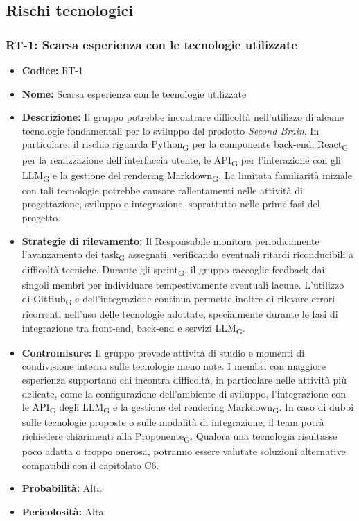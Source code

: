﻿\documentclass[a4paper, 10pt, colorlinks=true, linkcolor=black, urlcolor=blue, citecolor=blue, hidelinks]{article}
\begin{document}
\subsection{Rischi tecnologici}

\subsubsection{RT-1: Scarsa esperienza con le tecnologie utilizzate}

\begin{itemize}
    \item \textbf{Codice:} RT-1

    \item \textbf{Nome:} Scarsa esperienza con le tecnologie utilizzate

    \item \textbf{Descrizione:} Il gruppo potrebbe incontrare difficoltà nell'utilizzo di alcune tecnologie fondamentali per lo sviluppo del prodotto \textit{Second Brain}. In particolare, il rischio riguarda Python\textsubscript{G} per la componente back-end, React\textsubscript{G} per la realizzazione dell'interfaccia utente, le API\textsubscript{G} per l'interazione con gli LLM\textsubscript{G} e la gestione del rendering Markdown\textsubscript{G}. La limitata familiarità iniziale con tali tecnologie potrebbe causare rallentamenti nelle attività di progettazione, sviluppo e integrazione, soprattutto nelle prime fasi del progetto.

    \item \textbf{Strategie di rilevamento:} Il Responsabile monitora periodicamente l'avanzamento dei task\textsubscript{G} assegnati, verificando eventuali ritardi riconducibili a difficoltà tecniche. Durante gli sprint\textsubscript{G}, il gruppo raccoglie feedback dai singoli membri per individuare tempestivamente eventuali lacune. L'utilizzo di GitHub\textsubscript{G} e dell'integrazione continua permette inoltre di rilevare errori ricorrenti nell'uso delle tecnologie adottate, specialmente durante le fasi di integrazione tra front-end, back-end e servizi LLM\textsubscript{G}.

    \item \textbf{Contromisure:} Il gruppo prevede attività di studio e momenti di condivisione interna sulle tecnologie meno note. I membri con maggiore esperienza supportano chi incontra difficoltà, in particolare nelle attività più delicate, come la configurazione dell'ambiente di sviluppo, l'integrazione con le API\textsubscript{G} degli LLM\textsubscript{G} e la gestione del rendering Markdown\textsubscript{G}. In caso di dubbi sulle tecnologie proposte o sulle modalità di integrazione, il team potrà richiedere chiarimenti alla Proponente\textsubscript{G}. Qualora una tecnologia risultasse poco adatta o troppo onerosa, potranno essere valutate soluzioni alternative compatibili con il capitolato C6.

    \item \textbf{Probabilità:} Alta

    \item \textbf{Pericolosità:} Alta
\end{itemize}
\end{document}

